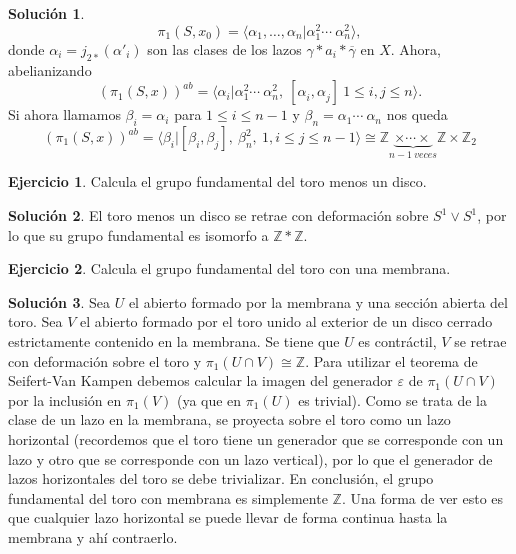 \documentclass{article}
\theoremstyle{plain}
\theoremstyle{definition}
\newtheorem{exercise}{Ejercicio}
\newtheorem*{sol*}{Solución}
\newcommand{\Z}{\mathbb{Z}}
\begin{document}
\begin{sol*}
\[
\pi_1(S,x_0)=\langle\alpha_1,\dots,\alpha_n|\alpha_1^2\cdots\ \alpha_n^2\rangle,
\]
donde $\alpha_i=j_{2*}(\alpha'_i)$ son las clases de los lazos $\gamma*a_i*\overline{\gamma}$ en $X$. Ahora, abelianizando
\[
(\pi_1(S,x))^{ab}=\langle\alpha_i|\alpha_1^2\cdots\ \alpha_n^2,\ [\alpha^{}_i,\alpha^{}_j]\ 1\leq i, j\leq n \rangle.
\]
Si ahora llamamos $\beta_i=\alpha_i$ para $1\leq i\leq n-1$ y $\beta_n=\alpha_1\cdots\ \alpha_n$ nos queda
\[
(\pi_1(S,x))^{ab}=\langle\beta_i|[\beta^{}_i,\beta^{}_j],\ \beta^2_n,\ 1, i\leq j\leq n-1\rangle\cong\Z\underbrace{\times\cdots\times}_{n-1\ veces}\Z\times\Z_2
\]
\end{sol*}

\newpage

\begin{exercise}

Calcula el grupo fundamental del toro menos un disco.

\end{exercise}
\begin{sol*}
El toro menos un disco se retrae con deformación sobre $S^1\vee S^1$, por lo que su grupo fundamental es isomorfo a $\Z*\Z$.
\end{sol*}

\newpage

\begin{exercise}

Calcula el grupo fundamental del toro con una membrana.

\end{exercise}
\begin{sol*}
Sea $U$ el abierto formado por la membrana y una sección abierta del toro. Sea $V$ el abierto formado por el toro unido al exterior de un disco cerrado estrictamente contenido en la membrana. Se tiene que $U$ es contráctil, $V$ se retrae con deformación sobre el toro y $\pi_1(U\cap V)\cong\Z$. Para utilizar el teorema de Seifert-Van Kampen debemos calcular la imagen del generador $\varepsilon$ de $\pi_1(U\cap V)$ por la inclusión en $\pi_1(V)$ (ya que en $\pi_1(U)$ es trivial). Como se trata de la clase de un lazo en la membrana, se proyecta sobre el toro como un lazo horizontal (recordemos que el toro tiene un generador que se corresponde con un lazo y otro que se corresponde con un lazo vertical), por lo que el generador de lazos horizontales del toro se debe trivializar. En conclusión, el grupo fundamental del toro con membrana es simplemente $\Z$. Una forma de ver esto es que cualquier lazo horizontal se puede llevar de forma continua hasta la membrana y ahí contraerlo.
\end{sol*}
\end{document}
